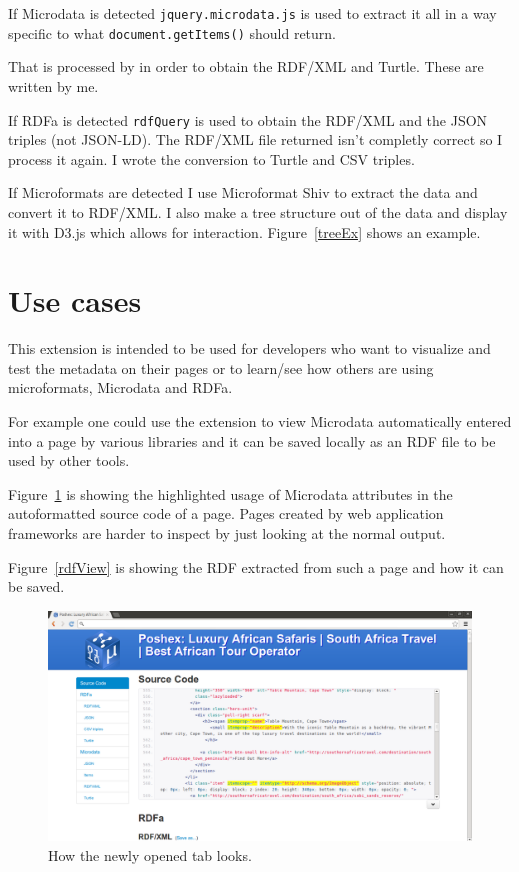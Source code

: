 \documentclass[12pt]{article}
\newcommand{\co}[1]{\texttt{#1}}
\begin{document}
If Microdata is detected \co{jquery.microdata.js} is used to extract it all in a
way specific to what \co{document.getItems()} should return.

That is processed by in order to obtain the RDF/XML and Turtle. These are
written by me.

If RDFa is detected \co{rdfQuery} is used to obtain the RDF/XML and the JSON
triples (not JSON-LD). The RDF/XML file returned isn't completly correct so I
process it again. I wrote the conversion to Turtle and CSV triples.

If Microformats are detected I use Microformat Shiv to extract the data and
convert it to RDF/XML. I also make a tree structure out of the data and display
it with D3.js which allows for interaction. Figure~\ref{treeEx} shows an
example.

\section{Use cases}

This extension is intended to be used for developers who want to visualize and
test the metadata on their pages or to learn/see how others are using
microformats, Microdata and RDFa.

For example one could use the extension to view Microdata automatically entered
into a page by various libraries and it can be saved locally as an RDF file to
be used by other tools.

Figure~\ref{sourceView} is showing the highlighted usage of Microdata attributes
in the autoformatted source code of a page. Pages created by web application
frameworks are harder to inspect by just looking at the normal output.

Figure~\ref{rdfView} is showing the RDF extracted from such a page and how it
can be saved.

\begin{figure}[t!]
    \centering
    \includegraphics[width=13cm]{source-view}
    \caption{How the newly opened tab looks.}
    \label{sourceView}
\end{figure}
\end{document}
